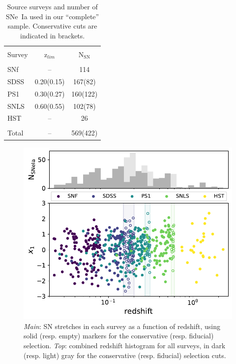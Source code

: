 \documentclass[]{aa} %
\newcommand{\nn}[1]{{\textcolor[rgb]{1, 0.27, 0}{#1}}}
\begin{document}
\begin{table}
    \centering
    \caption{\nn{Source surveys and number of SNe~Ia used in our ``complete''
    sample. Conservative cuts are indicated in brackets.}}
    \label{tab:sample}
    \begin{tabular}{l c c}
    \hline\hline\\[-0.8em]
        Survey & z$_{lim}$ & N$_{\mathrm{SN}}$ \\[0.15em]
        \hline\\[-0.8em]
        SNf & -- & 114\\[0.30em]
        SDSS & 0.20(0.15) & 167(82)\\[0.30em]
        PS1 & 0.30(0.27) & 160(122)\\[0.30em]        
        SNLS & 0.60(0.55) & 102(78)\\[0.30em]
        HST & -- & 26\\[0.30em]
        \hline\\[-0.8em]
        Total & -- & 569(422)\\[0.30em]
        \hline
    \end{tabular}
\end{table}

\begin{figure}
    \centering
    \includegraphics[width=0.95\linewidth]{Article_figures/stretchs-cut_btw_hist_cumu_75-lb.pdf}
    \caption{\nn{\textit{Main}: SN stretches in each survey as a function of redshift, using solid (resp. empty) markers for the
    conservative (resp. fiducial) selection. \textit{Top}: combined redshift 
    histogram for all surveys, in dark (resp. light) gray for the conservative (resp. fiducial) selection cuts.}}
    \label{fig:sample}
\end{figure}
\end{document}

